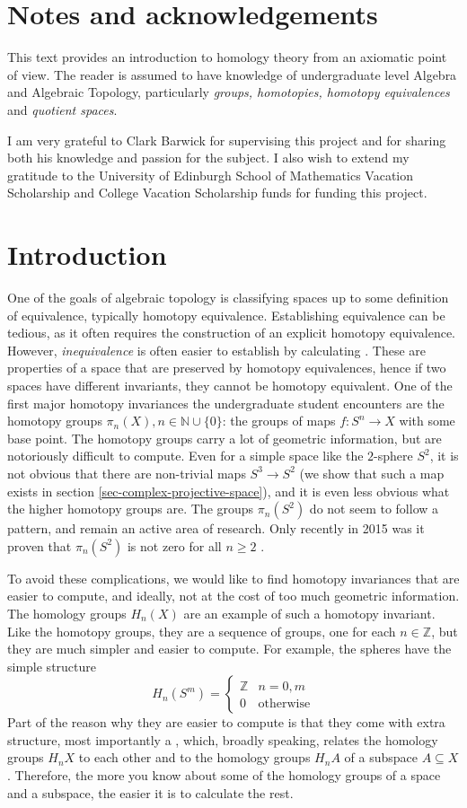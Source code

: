 \section{Notes and acknowledgements}
This text provides an introduction to homology theory from an axiomatic point of view. The reader is assumed to have knowledge of undergraduate level Algebra and Algebraic Topology, particularly \textit{groups, homotopies, homotopy equivalences} and \textit{quotient spaces}.

I am very grateful to Clark Barwick for supervising this project and for sharing both his knowledge and passion for the subject. I also wish to extend my gratitude to the University of Edinburgh School of Mathematics Vacation Scholarship and College Vacation Scholarship funds for funding this project.
\section{Introduction}
One of the goals of algebraic topology is classifying spaces up to some definition of equivalence, typically homotopy equivalence. Establishing equivalence can be tedious, as it often requires the construction of an explicit homotopy equivalence. However, \textit{inequivalence} is often easier to establish by calculating . These are properties of a space that are preserved by homotopy equivalences, hence if two spaces have different invariants, they cannot be homotopy equivalent. One of the first major homotopy invariances the undergraduate student encounters are the homotopy groups $\pi_n(X),n\in \mathbb{N}\cup \{0\}$: the groups of maps $f:S^{n}\rightarrow X$ with some base point. The homotopy groups carry a lot of geometric information, but are notoriously difficult to compute. Even for a simple space like the $2$-sphere $S^2$, it is not obvious that there are non-trivial maps $S^3\rightarrow S^2$ (we show that such a map exists in section \ref{sec-complex-projective-space}), and it is even less obvious what the higher homotopy groups are. The groups $\pi_n(S^2)$ do not seem to follow a pattern, and remain an active area of research. Only recently in 2015 was it proven that $\pi_n(S^2)$ is not zero for all $n\geq 2$ \cite{Ivanov}.

To avoid these complications, we would like to find homotopy invariances that are easier to compute, and ideally, not at the cost of too much geometric information. The homology groups $H_n(X)$ are an example of such a homotopy invariant. Like the homotopy groups, they are a sequence of groups, one for each $n\in \mathbb{Z}$, but they are much simpler and easier to compute. For example, the spheres have the simple structure $$H_n(S^m)=\begin{cases}\mathbb{Z} & n=0,m\\ 0 & \text{otherwise}\end{cases}$$
Part of the reason why they are easier to compute is that they come with extra structure, most importantly a , which, broadly speaking, relates the homology groups $H_nX$ to each other and to the homology groups $H_nA$ of a subspace $A\subseteq X$. Therefore, the more you know about some of the homology groups of a space and a subspace, the easier it is to calculate the rest.

